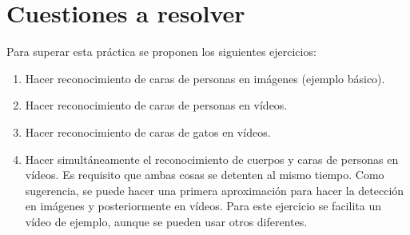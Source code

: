 \documentclass[a4paper]{article}
\newcommand{\myref}[1]{\textsuperscript{\textbf{\ref{#1}}}} %
\begin{document}


\section{Cuestiones a resolver}
Para superar esta práctica se proponen los siguientes ejercicios: 
\begin{enumerate}
    \item Hacer reconocimiento de caras de personas en imágenes (ejemplo básico).
    \item Hacer reconocimiento de caras de personas en vídeos.
    \item Hacer reconocimiento de caras de gatos en vídeos.
    \item Hacer simultáneamente el reconocimiento de cuerpos y caras de personas en vídeos. Es requisito que ambas cosas se detenten al mismo tiempo. Como sugerencia, se puede hacer una primera aproximación para hacer la detección en imágenes y posteriormente en vídeos. Para este ejercicio se facilita un vídeo de ejemplo, aunque se pueden usar otros diferentes. 
\end{enumerate}
\end{document}
